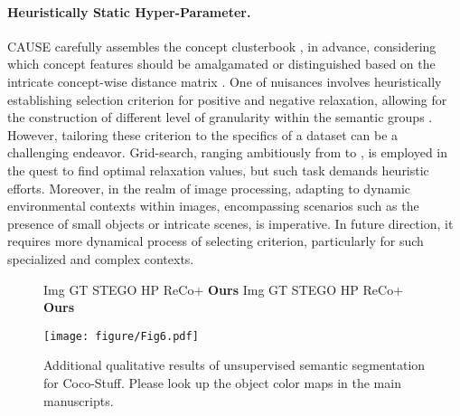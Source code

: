 \documentclass{article} \usepackage{iclr2024_conference,times}
\begin{document}
\paragraph{Heuristically Static Hyper-Parameter.} 
CAUSE carefully assembles the concept clusterbook , in advance, considering which concept features should be amalgamated or distinguished based on the intricate concept-wise distance matrix . One of nuisances involves heuristically establishing selection criterion for positive  and negative  relaxation, allowing for the construction of different level of granularity within the semantic groups . However, tailoring these criterion to the specifics of a dataset can be a challenging endeavor. Grid-search, ranging ambitiously from  to , is employed in the quest to find optimal relaxation values, but such task demands heuristic efforts. Moreover, in the realm of image processing, adapting to dynamic environmental contexts within images, encompassing scenarios such as the presence of small objects or intricate scenes, is imperative. In future direction, it requires more dynamical process of selecting criterion, particularly for such specialized and complex contexts.

\begin{figure*}[b]
\centering
\begin{flushleft}
    \hspace{0.3cm} Img \hspace{0.4cm} GT \hspace{0.17cm} STEGO   \hspace{0.18cm} HP
    \hspace{0.23cm} ReCo+
    \hspace{0.07cm} \textbf{Ours}
    \hspace{0.5cm} Img \hspace{0.4cm} GT \hspace{0.17cm} STEGO   \hspace{0.18cm} HP
    \hspace{0.23cm} ReCo+
    \hspace{0.07cm} \textbf{Ours}
\end{flushleft}	
\vspace*{-0.2cm}
\texttt{[image: figure/Fig6.pdf]}
\caption{Additional qualitative results of unsupervised semantic segmentation for Coco-Stuff. Please look up the object color maps in the main manuscripts.} 
\label{fig:a_coco}

\end{figure*}
\end{document}
